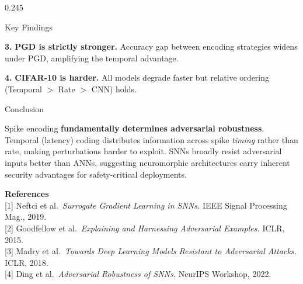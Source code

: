 \documentclass[final]{beamer}
\begin{document}
\begin{frame}[t]
\begin{columns}[t,totalwidth=\paperwidth]
\begin{column}{0.245\paperwidth}
\begin{block}{Key Findings}
  \vspace{0.28em}
  \colorbox{pgdred!10}{\parbox{\dimexpr\linewidth-8pt\relax}{%
    \small\textbf{\color{pgdred}3.}
    \textbf{PGD is strictly stronger.} Accuracy gap between encoding
    strategies widens under PGD, amplifying the temporal advantage.}}

  \vspace{0.28em}
  \colorbox{cnnpurple!12}{\parbox{\dimexpr\linewidth-8pt\relax}{%
    \small\textbf{\color{cnnpurple}4.}
    \textbf{CIFAR-10 is harder.} All models degrade faster but relative
    ordering (Temporal $>$ Rate $>$ CNN) holds.}}
\end{block}

\begin{block}{Conclusion}
  \colorbox{headerblue}{\parbox{\dimexpr\linewidth-8pt\relax}{%
    \small\color{white}
    Spike encoding \textbf{fundamentally determines adversarial robustness}.
    Temporal (latency) coding distributes information across spike
    \emph{timing} rather than rate, making perturbations harder to exploit.
    SNNs broadly resist adversarial inputs better than ANNs, suggesting
    neuromorphic architectures carry inherent security advantages for
    safety-critical deployments.}}

  \vspace{0.4em}
  \textbf{\color{accentblue}References}\\[0.12em]
  {\footnotesize
  [1] Neftci et al.\ \textit{Surrogate Gradient Learning in SNNs.}
      IEEE Signal Processing Mag., 2019.\\[0.1em]
  [2] Goodfellow et al.\ \textit{Explaining and Harnessing Adversarial
      Examples.} ICLR, 2015.\\[0.1em]
  [3] Madry et al.\ \textit{Towards Deep Learning Models Resistant to
      Adversarial Attacks.} ICLR, 2018.\\[0.1em]
  [4] Ding et al.\ \textit{Adversarial Robustness of SNNs.}
      NeurIPS Workshop, 2022.}
\end{block}

\end{column}
\end{columns}


\end{frame}
\end{document}
